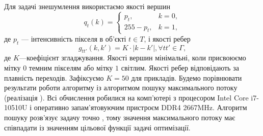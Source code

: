 Для задачі знешумлення використаємо якості вершин 
\begin{equation}
    q_t(k) = 
    \begin{cases}
        p_t, & k = 0,\\
        255-p_t, & k = 1,
    \end{cases}
\end{equation}
де $p_t$ --- інтенсивність пікселя в об'єкті $t\in T$, 
і якості ребер
\begin{equation}
    g_{tt'}(k,k') = K\cdot|k-k'|, \forall tt'\in\Gamma,
\end{equation}
де $K$---коефіцієнт згладжування.
Якості вершин мінімальні, коли присвоюємо мітку $0$ темним пікселям або мітку $1$ світлим.
Якості ребер відповідають за плавність переходів. Зафіксуємо $K=50$ для прикладів.
Будемо порівнювати результати роботи алгоритму із алгоритмом
пошуку максимального потоку (реалізація \cite{Boykov}). Всі обчислення робилися
на комп'ютері з процесором Intel Core i7-10510U і оперативно
запам'ятовуючим пристроєм DDR4 2667MHz. Алгоритм пошуку розв'язує задачу точно \cite{Boykov,Boykov_2,ishikawa,savchynskyy}, тому
значення максимального потоку має співпадати із значенням цільової функції задачі
оптимізації.
